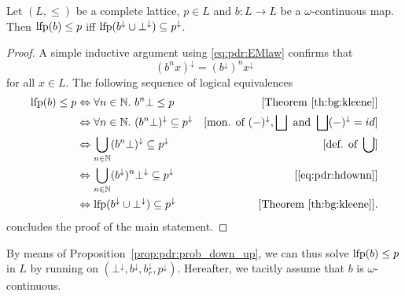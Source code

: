 \begin{prop}\label{prop:pdr:prob_down_up}
	Let $(L,\le)$ be a complete lattice, $p\in L$ and $b \colon L \to L$ be a $\omega$-continuous map. Then $\text{lfp}(b) \le p$ iff $\text{lfp}(b^\downarrow \cup \bot^\downarrow) \subseteq p^\downarrow$.
\end{prop}
\begin{proof}
	A simple inductive argument using \eqref{eq:pdr:EMlaw} confirms that
	\begin{equation}\label{eq:pdr:hdownn}
		(b^n x)^\downarrow = (b^\downarrow)^n x^\downarrow
	\end{equation}
	for all $x\in L$. The following sequence of logical equivalences
	\begin{align*}
		\text{lfp}(b) \le p & \Leftrightarrow \forall n \in \mathbb{N}.~b^n \bot \le p                                           & [\text{Theorem \ref{th:bg:kleene}}]                                                   \\
		              & \Leftrightarrow \forall n \in \mathbb{N}.~(b^n \bot)^\downarrow \subseteq p^\downarrow             & [\text{mon. of }(-)^\downarrow, \bigsqcup \text{ and } \bigsqcup (-)^{\downarrow}=id] \\
		              & \Leftrightarrow \bigcup_{n \in \mathbb{N}} (b^n \bot)^\downarrow  \subseteq p^\downarrow           & [\text{def. of }\bigcup]                                                              \\
		              & \Leftrightarrow \bigcup_{n \in \mathbb{N}} (b^\downarrow)^n \bot^\downarrow \subseteq p^\downarrow & [\eqref{eq:pdr:hdownn}]                                                               \\
		              & \Leftrightarrow \text{lfp}(b^\downarrow \cup \bot^\downarrow) \subseteq p^\downarrow                     & [\text{Theorem \ref{th:bg:kleene}}].
	\end{align*}
	concludes the proof of the main statement.
\end{proof}

By means of Proposition~\ref{prop:pdr:prob_down_up}, we can thus solve $\text{lfp}(b) \le p$ in $L$ by running {\APDR} on $(\bot^\downarrow, b^\downarrow,b_r^{\downarrow}, p^{\downarrow})$.
Hereafter, we tacitly assume that $b$ is $\omega$-continuous.

